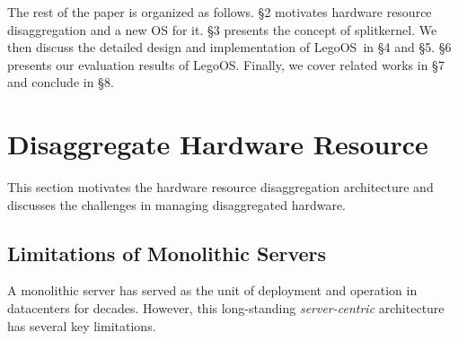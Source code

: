\documentclass[10pt,times,twocolumn]{z2-article}
\renewcommand{\em}{\it}
\newcommand{\splitkernel}{splitkernel}
\newcommand{\lego}{LegoOS}
\providecommand{\DIFdelbegin}{} %
\providecommand{\DIFdelend}{} %
\newcommand{\DIFscaledelfig}{0.5}
\newlength{\DIFdelgraphicswidth} %
\newlength{\DIFdelgraphicsheight} %
\newcommand{\DIFdelincludegraphics}[2][]{%
\sbox{\DIFdelgraphicsbox}{\DIFOincludegraphics[#1]{#2}}%
\settoboxwidth{\DIFdelgraphicswidth}{\DIFdelgraphicsbox} %
\settoboxtotalheight{\DIFdelgraphicsheight}{\DIFdelgraphicsbox} %
\scalebox{\DIFscaledelfig}{%
\parbox[b]{\DIFdelgraphicswidth}{\usebox{\DIFdelgraphicsbox}\\[-\baselineskip] \rule{\DIFdelgraphicswidth}{0em}}\llap{\resizebox{\DIFdelgraphicswidth}{\DIFdelgraphicsheight}{%
\setlength{\unitlength}{\DIFdelgraphicswidth}%
\begin{picture}(1,1)%
\thicklines\linethickness{2pt} %
{\color[rgb]{1,0,0}\put(0,0){\framebox(1,1){}}}%
{\color[rgb]{1,0,0}\put(0,0){\line( 1,1){1}}}%
{\color[rgb]{1,0,0}\put(0,1){\line(1,-1){1}}}%
\end{picture}%
}\hspace*{3pt}}} %
} %
\DeclareRobustCommand{\DIFdelbegin}{\DIFOdelbegin \let\includegraphics\DIFdelincludegraphics} %
\DeclareRobustCommand{\DIFdelend}{\DIFOaddend \let\includegraphics\DIFOincludegraphics} %
\begin{document}
The rest of the paper is organized as follows.
\S{}2 motivates hardware resource disaggregation and a new OS for it.
\S{}3 presents the concept of \splitkernel.
We then discuss the detailed design and implementation of \lego\ in \S{}4 and \S{}5.
\S{}6 presents our evaluation results of \lego.
Finally, we cover related works in \S{}7 and conclude in \S{}8.
\DIFdelbegin %

\DIFdelend \section{Disaggregate Hardware Resource}
\label{sec:motivation}

This section %
motivates the hardware resource disaggregation architecture
and discusses the challenges in managing disaggregated hardware.

\subsection{Limitations of Monolithic Servers}
\label{sec:monolimit}
A monolithic server has served as the unit of deployment and operation in datacenters
for decades. %
However, this long-standing {\em server-centric} architecture has several key limitations.
\end{document}
